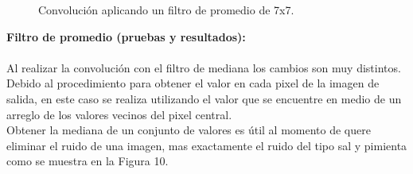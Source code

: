 \documentclass[conference]{IEEEtran}
\begin{document}
\begin{figure}[h]
	\centering
	\caption{Convoluci\'on aplicando un filtro de promedio de 7x7.}
\end{figure}

\textbf{ Filtro de promedio (pruebas y resultados):\\\\}
Al realizar la convoluci\'on con el filtro de mediana los cambios son muy distintos. Debido al procedimiento para obtener el valor en cada pixel de la imagen de salida, en este caso se realiza utilizando el valor que se encuentre en medio de un arreglo de los valores vecinos del pixel central.\\
Obtener la mediana de un conjunto de valores es \'util al momento de quere eliminar el ruido de una imagen, mas exactamente el ruido del tipo sal y pimienta como se muestra en la Figura 10.
\end{document}
